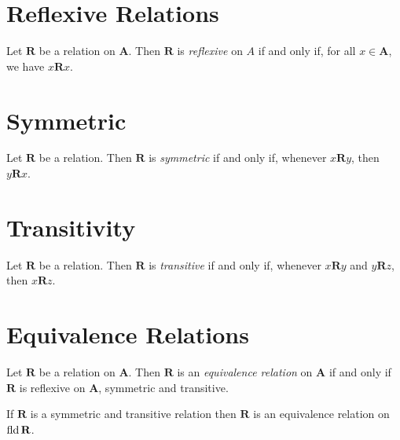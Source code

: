 \section{Reflexive Relations}

\begin{definition}
    Let $\mathbf{R}$ be a relation on $\mathbf{A}$. Then $\mathbf{R}$ is \emph{reflexive} on $A$
    if and only if, for all $x \in \mathbf{A}$, we have $x\mathbf{R}x$.
\end{definition}

\section{Symmetric}

\begin{definition}
    Let $\mathbf{R}$ be a relation. Then $\mathbf{R}$ is \emph{symmetric} if and only if,
    whenever $x\mathbf{R}y$, then $y\mathbf{R}x$.
\end{definition}

\section{Transitivity}

\begin{definition}
    Let $\mathbf{R}$ be a relation. Then $\mathbf{R}$ is \emph{transitive} if and only if,
    whenever $x\mathbf{R}y$ and $y\mathbf{R}z$, then $x\mathbf{R}z$.
\end{definition}

\section{Equivalence Relations}

\begin{definition}
    Let $\mathbf{R}$ be a relation on $\mathbf{A}$. Then $\mathbf{R}$ is an \emph{equivalence relation}
    on $\mathbf{A}$ if and only if $\mathbf{R}$ is reflexive on $\mathbf{A}$, symmetric and transitive.
\end{definition}

\begin{theorem}[Pairing]
    If $\mathbf{R}$ is a symmetric and transitive relation then $\mathbf{R}$ is an equivalence
    relation on $\operatorname{fld} \mathbf{R}$.
\end{theorem}

